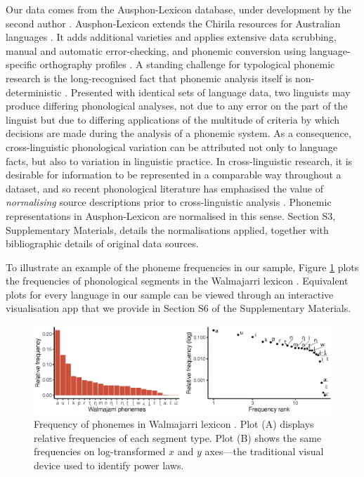 Our data comes from the Ausphon-Lexicon database, under development by the second author \autocite{round_ausphon-lexicon_2017}. Ausphon-Lexicon extends the Chirila resources for Australian languages \autocite{bowern_chirila:_2016}. It adds additional varieties and applies extensive data scrubbing, manual and automatic error-checking, and phonemic conversion using language-specific orthography profiles \autocite{moran_unicode_2018}. A standing challenge for typological phonemic research is the long-recognised fact that phonemic analysis itself is non-deterministic \autocites{chao_non-uniqueness_1934}{hockett_problem_1963}{hyman_universals_2008}{dresher_contrastive_2009}. Presented with identical sets of language data, two linguists may produce differing phonological analyses, not due to any error on the part of the linguist but due to differing applications of the multitude of criteria by which decisions are made during the analysis of a phonemic system. As a consequence, cross-linguistic phonological variation can be attributed not only to language facts, but also to variation in linguistic practice. In cross-linguistic research, it is desirable for information to be represented in a comparable way throughout a dataset, and so recent phonological literature has emphasised the value of \emph{normalising} source descriptions prior to cross-linguistic analysis \autocites{lass_vowel_1984}{hyman_universals_2008}{van_der_hulst_phonological_2017}{round_matthew_2017}{kiparsky_formal_2018}. Phonemic representations in Ausphon-Lexicon are normalised in this sense. Section S3, Supplementary Materials, details the normalisations applied, together with bibliographic details of original data sources.

To illustrate an example of the phoneme frequencies in our sample, Figure \ref{fig:Figure-1} plots the frequencies of phonological segments in the Walmajarri lexicon \autocite{hudson_walmajarri_1993}. Equivalent plots for every language in our sample can be viewed through an interactive visualisation app that we provide in Section S6 of the Supplementary Materials.

\begin{figure}

{\centering \includegraphics[width=180mm]{03-phoneme-frequencies/fig/Fig1_walmajarri} 

}

\caption[Frequency of phonemes in Walmajarri lexicon \autocite{hudson_walmajarri_1993}]{Frequency of phonemes in Walmajarri lexicon \autocite{hudson_walmajarri_1993}. Plot (A) displays relative frequencies of each segment type. Plot (B) shows the same frequencies on log-transformed \(x\) and \(y\) axes---the traditional visual device used to identify power laws.}\label{fig:Figure-1}
\end{figure}



